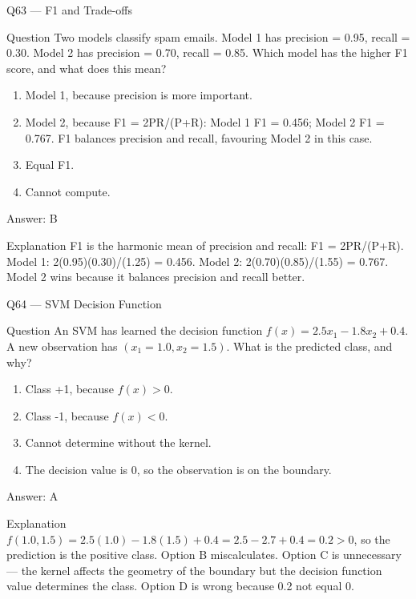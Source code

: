 \documentclass[aspectratio=169,8pt]{beamer}
\begin{document}
	\begin{frame}{Q63 --- F1 and Trade-offs}
		\begin{block}{Question}
			Two models classify spam emails. Model 1 has precision = 0.95, recall = 0.30. Model 2 has precision = 0.70, recall = 0.85. Which model has the higher F1 score, and what does this mean?
		\end{block}
		\begin{enumerate}
			\item Model 1, because precision is more important.
			\item Model 2, because F1 = 2PR/(P+R): Model 1 F1 = 0.456; Model 2 F1 = 0.767. F1 balances precision and recall, favouring Model 2 in this case.
			\item Equal F1.
			\item Cannot compute.
		\end{enumerate}
		\begin{exampleblock}{Answer: B}\end{exampleblock}
		\begin{block}{Explanation}
			F1 is the harmonic mean of precision and recall: F1 = 2PR/(P+R). Model 1: 2(0.95)(0.30)/(1.25) = 0.456. Model 2: 2(0.70)(0.85)/(1.55) = 0.767. Model 2 wins because it balances precision and recall better.
		\end{block}
	\end{frame}
	
	\begin{frame}{Q64 --- SVM Decision Function}
		\begin{block}{Question}
			An SVM has learned the decision function $f(x) = 2.5 x_1 - 1.8 x_2 + 0.4$. A new observation has $(x_1 = 1.0, x_2 = 1.5)$. What is the predicted class, and why?
		\end{block}
		\begin{enumerate}
			\item Class +1, because $f(x) > 0$.
			\item Class -1, because $f(x) < 0$.
			\item Cannot determine without the kernel.
			\item The decision value is 0, so the observation is on the boundary.
		\end{enumerate}
		\begin{exampleblock}{Answer: A}\end{exampleblock}
		\begin{block}{Explanation}
			$f(1.0, 1.5) = 2.5(1.0) - 1.8(1.5) + 0.4 = 2.5 - 2.7 + 0.4 = 0.2 > 0$, so the prediction is the positive class. Option B miscalculates. Option C is unnecessary --- the kernel affects the geometry of the boundary but the decision function value determines the class. Option D is wrong because 0.2 not equal 0.
		\end{block}
	\end{frame}
	
\end{document}
